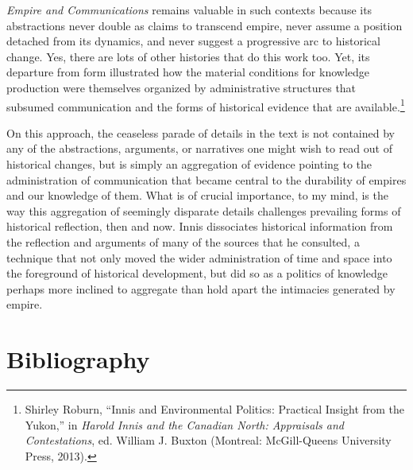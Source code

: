 \documentclass{tufte-handout}
\begin{document}
\emph{Empire and Communications} remains valuable in such contexts
because its abstractions never double as claims to transcend empire,
never assume a position detached from its dynamics, and never suggest a
progressive arc to historical change. Yes, there are lots of other
histories that do this work too. Yet, its departure from form
illustrated how the material conditions for knowledge production were
themselves organized by administrative structures that subsumed
communication and the forms of historical evidence that are
available.\footnote{Shirley Roburn, ``Innis and Environmental Politics:
  Practical Insight from the Yukon,'' in \emph{Harold Innis and the
  Canadian North: Appraisals and Contestations}, ed. William J. Buxton
  (Montreal: McGill-Queens University Press, 2013).}

On this approach, the ceaseless parade of details in the text is not
contained by any of the abstractions, arguments, or narratives one might
wish to read out of historical changes, but is simply an aggregation of
evidence pointing to the administration of communication that became
central to the durability of empires and our knowledge of them. What is
of crucial importance, to my mind, is the way this aggregation of
seemingly disparate details challenges prevailing forms of historical
reflection, then and now. Innis dissociates historical information from
the reflection and arguments of many of the sources that he consulted, a
technique that not only moved the wider administration of time and space
into the foreground of historical development, but did so as a politics
of knowledge perhaps more inclined to aggregate than hold apart the
intimacies generated by empire.




\section{Bibliography}\label{bibliography}
\end{document}
